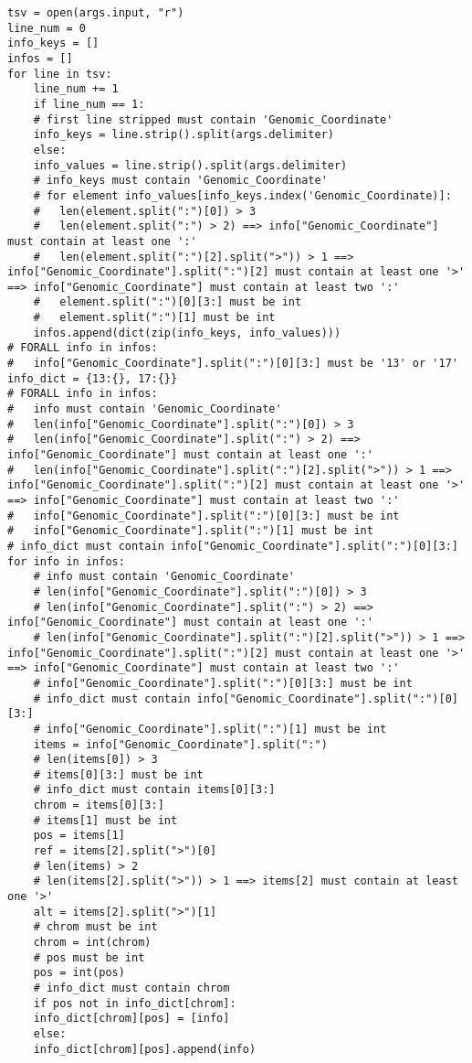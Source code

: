 \documentclass[11pt]{article}
\begin{document}
\begin{minipage}{\linewidth}
  \centering
\begin{lstlisting}[language=Python2]
tsv = open(args.input, "r")
line_num = 0
info_keys = []
infos = []
for line in tsv:
    line_num += 1
    if line_num == 1:
	# first line stripped must contain 'Genomic_Coordinate'
	info_keys = line.strip().split(args.delimiter)
    else:
	info_values = line.strip().split(args.delimiter)
	# info_keys must contain 'Genomic_Coordinate'
	# for element info_values[info_keys.index('Genomic_Coordinate)]:
	# 	len(element.split(":")[0]) > 3
	# 	len(element.split(":") > 2) ==> info["Genomic_Coordinate"] must contain at least one ':'
	# 	len(element.split(":")[2].split(">")) > 1 ==> info["Genomic_Coordinate"].split(":")[2] must contain at least one '>' ==> info["Genomic_Coordinate"] must contain at least two ':'
	# 	element.split(":")[0][3:] must be int
	# 	element.split(":")[1] must be int
	infos.append(dict(zip(info_keys, info_values)))
# FORALL info in infos:
# 	info["Genomic_Coordinate"].split(":")[0][3:] must be '13' or '17'
info_dict = {13:{}, 17:{}}
# FORALL info in infos:
# 	info must contain 'Genomic_Coordinate'
# 	len(info["Genomic_Coordinate"].split(":")[0]) > 3
# 	len(info["Genomic_Coordinate"].split(":") > 2) ==> info["Genomic_Coordinate"] must contain at least one ':'
# 	len(info["Genomic_Coordinate"].split(":")[2].split(">")) > 1 ==> info["Genomic_Coordinate"].split(":")[2] must contain at least one '>' ==> info["Genomic_Coordinate"] must contain at least two ':'
# 	info["Genomic_Coordinate"].split(":")[0][3:] must be int
# 	info["Genomic_Coordinate"].split(":")[1] must be int
# info_dict must contain info["Genomic_Coordinate"].split(":")[0][3:]
for info in infos:
    # info must contain 'Genomic_Coordinate'
    # len(info["Genomic_Coordinate"].split(":")[0]) > 3
    # len(info["Genomic_Coordinate"].split(":") > 2) ==> info["Genomic_Coordinate"] must contain at least one ':'
    # len(info["Genomic_Coordinate"].split(":")[2].split(">")) > 1 ==> info["Genomic_Coordinate"].split(":")[2] must contain at least one '>' ==> info["Genomic_Coordinate"] must contain at least two ':'
    # info["Genomic_Coordinate"].split(":")[0][3:] must be int
    # info_dict must contain info["Genomic_Coordinate"].split(":")[0][3:]
    # info["Genomic_Coordinate"].split(":")[1] must be int
    items = info["Genomic_Coordinate"].split(":")
    # len(items[0]) > 3
    # items[0][3:] must be int
    # info_dict must contain items[0][3:]
    chrom = items[0][3:]
    # items[1] must be int
    pos = items[1]
    ref = items[2].split(">")[0]
    # len(items) > 2
    # len(items[2].split(">")) > 1 ==> items[2] must contain at least one '>'
    alt = items[2].split(">")[1]
    # chrom must be int
    chrom = int(chrom)
    # pos must be int
    pos = int(pos)
    # info_dict must contain chrom
    if pos not in info_dict[chrom]:
	info_dict[chrom][pos] = [info]
    else:
	info_dict[chrom][pos].append(info)
\end{lstlisting}
\end{minipage}
\end{document}
